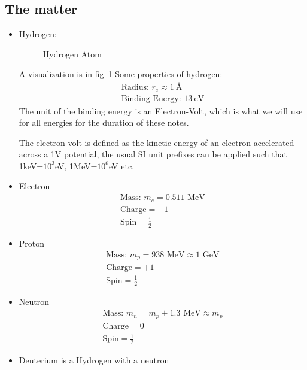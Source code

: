 \subsection{The matter}
\begin{itemize}
\item Hydrogen:
  \begin{figure}[H]
    \centering
    \caption{Hydrogen Atom}
    \label{fig:hydrogen}
  \end{figure}
  A visualization is in fig~\ref{fig:hydrogen} Some properties of hydrogen:
  \begin{gather*}
    \text{Radius: } r_e\approx \SI{1}{\angstrom}\\
    \text{Binding Energy: }\SI{13}{\eV}
  \end{gather*}
  The unit of the binding energy is an Electron-Volt, which is what we will use for all energies for the duration of these notes.
  \begin{definition}
    The electron volt is defined as the kinetic energy of an electron accelerated across a 1V potential, the usual SI unit prefixes can be applied such that 1keV=$10^3$eV, 1MeV=$10^6$eV etc.
  \end{definition}
\item Electron
  \begin{gather*}
    \text{Mass: } m_e= 0.511\text{ MeV}\\
    \text{Charge}=-1\\
    \text{Spin}=\frac12
  \end{gather*}
\item Proton
  \begin{gather*}
    \text{Mass: } m_p= 938\text{ MeV}\approx 1\text{ GeV}\\
    \text{Charge}=+1\\
    \text{Spin}=\frac12
  \end{gather*}
  \item Neutron
  \begin{gather*}
    \text{Mass: } m_n= m_p+1.3\text{ MeV}\approx m_p\\
    \text{Charge}=0\\
    \text{Spin}=\frac12
  \end{gather*}
  \item Deuterium is a Hydrogen with a neutron
\end{itemize}

